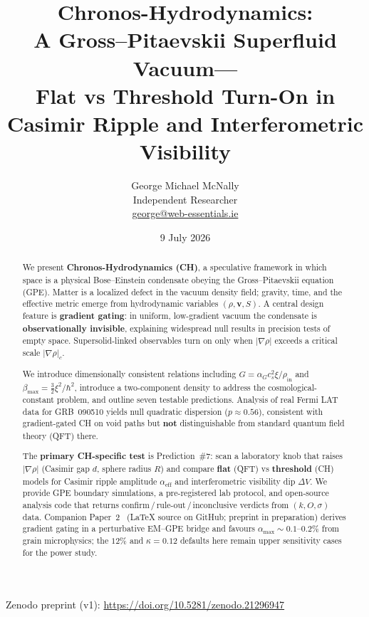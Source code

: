 \documentclass[11pt,a4paper]{article}
\title{%
  Chronos-Hydrodynamics:\\
  A Gross--Pitaevskii Superfluid Vacuum---\\
  Flat vs Threshold Turn-On in Casimir Ripple and Interferometric Visibility%
}
\author{%
  George Michael McNally\\[0.25em]
  \small Independent Researcher\\[0.15em]
  \small \href{mailto:george@web-essentials.ie}{george@web-essentials.ie}%
}
\date{9 July 2026}
\begin{document}
\maketitle
\begin{center}
  \small Zenodo preprint (v1): \url{https://doi.org/10.5281/zenodo.21296947}
\end{center}
\vspace{0.75em}

\begin{abstract}
We present \textbf{Chronos-Hydrodynamics (CH)}, a speculative framework in which space is a physical Bose--Einstein condensate obeying the Gross--Pitaevskii equation (GPE).
Matter is a localized defect in the vacuum density field; gravity, time, and the effective metric emerge from hydrodynamic variables $(\rho, \mathbf{v}, S)$.
A central design feature is \textbf{gradient gating}: in uniform, low-gradient vacuum the condensate is \textbf{observationally invisible}, explaining widespread null results in precision tests of empty space.
Supersolid-linked observables turn on only when $|\nabla\rho|$ exceeds a critical scale $|\nabla\rho|_c$.

We introduce dimensionally consistent relations including $G = \alpha_G c_s^2 \xi / \rho_{\mathrm{in}}$ and $\beta_{\max} = \tfrac{3}{2}\xi^2/\hbar^2$, introduce a two-component density to address the cosmological-constant problem, and outline seven testable predictions.
Analysis of real Fermi LAT data for GRB~090510 yields null quadratic dispersion ($p \approx 0.56$), consistent with gradient-gated CH on void paths but \textbf{not} distinguishable from standard quantum field theory (QFT) there.

The \textbf{primary CH-specific test} is Prediction~\#7: scan a laboratory knob that raises $|\nabla\rho|$ (Casimir gap $d$, sphere radius $R$) and compare \textbf{flat} (QFT) vs \textbf{threshold} (CH) models for Casimir ripple amplitude $\alpha_{\mathrm{eff}}$ and interferometric visibility dip $\Delta V$.
We provide GPE boundary simulations, a pre-registered lab protocol, and open-source analysis code that returns confirm\,/\,rule-out\,/\,inconclusive verdicts from $(k, O, \sigma)$ data.
Companion Paper~2~\cite{CHPaper2} (LaTeX source on GitHub; preprint in preparation) derives gradient gating in a perturbative EM--GPE bridge and favours $\alpha_{\max} \sim 0.1$--$0.2\%$ from grain microphysics; the $12\%$ and $\kappa=0.12$ defaults here remain upper sensitivity cases for the power study.
\end{abstract}
\end{document}
